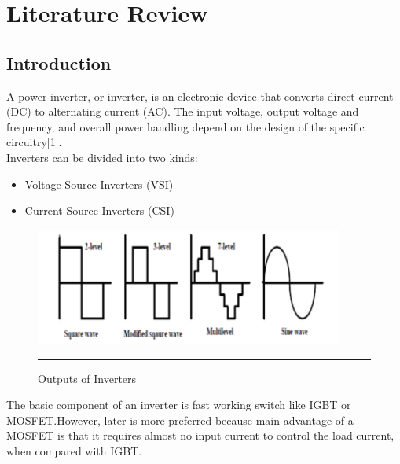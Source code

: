 
\chapter{Literature Review} %
\label{Chapter1}

\section{Introduction}
A power inverter, or inverter, is an electronic device that converts direct current (DC) to alternating current (AC).
The input voltage, output voltage and frequency, and overall power handling depend on the design of the specific circuitry[1].\\ 
Inverters can be divided into two kinds:
\begin{itemize}
\item Voltage Source Inverters (VSI)
\item Current Source Inverters (CSI)
\end{itemize}
\begin{figure}[htbp]
	\centering
		\includegraphics[width = 4in]{./Figures/Picture1.pdf}
		\rule{35em}{5pt}
	\caption{Outputs of Inverters}
	\label{fig:1}
\end{figure}
The basic component of an inverter is fast working switch like IGBT or MOSFET.However, later is more preferred because main advantage of a MOSFET is that it requires almost no input current to control the load current, when compared with IGBT.

